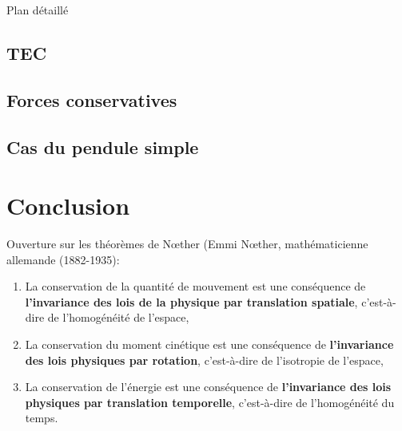 \begin{reportBlock}{Plan détaillé}
\subsection{TEC}
\subsection{Forces conservatives}
\subsection{Cas du pendule simple}

\section*{Conclusion}
Ouverture sur les théorèmes de N\oe ther (Emmi N\oe ther, mathématicienne allemande (1882-1935):
\begin{enumerate}
    \item La conservation de la quantité de mouvement est une conséquence de \textbf{l'invariance des lois de la physique par translation spatiale}, c'est-à-dire de l'homogénéité de l'espace,
    \item  La conservation du moment cinétique est une conséquence de \textbf{l'invariance des lois physiques par rotation}, c'est-à-dire de l'isotropie de l'espace,
    \item La conservation de l'énergie est une conséquence de \textbf{l'invariance des lois physiques par translation temporelle}, c'est-à-dire de l'homogénéité du temps.
\end{enumerate}

\end{reportBlock}